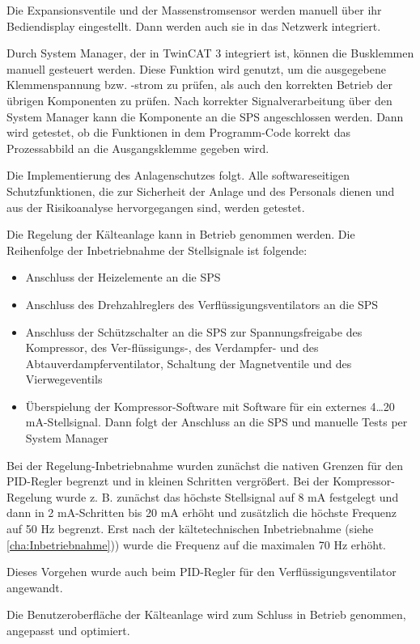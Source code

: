 Die Expansionsventile und der Massenstromsensor werden manuell über ihr Bediendisplay eingestellt. Dann werden  auch sie in das Netzwerk integriert. 
 
Durch System Manager, der in TwinCAT 3 integriert ist,   können die Busklemmen manuell gesteuert werden. Diese Funktion wird genutzt, um die ausgegebene Klemmenspannung bzw. -strom zu prüfen, als auch den korrekten Betrieb der übrigen Komponenten zu prüfen. Nach korrekter Signalverarbeitung über den System Manager kann die Komponente an die SPS angeschlossen werden. Dann wird getestet, ob die Funktionen in dem Programm-Code korrekt das Prozessabbild an die Ausgangsklemme gegeben wird. 

Die Implementierung des Anlagenschutzes folgt. Alle softwareseitigen Schutzfunktionen, die zur Sicherheit der Anlage und des Personals dienen und aus der Risikoanalyse hervorgegangen sind, werden getestet. 

Die Regelung der Kälteanlage kann in Betrieb genommen werden. Die Reihenfolge der Inbetriebnahme der Stellsignale ist folgende:

\begin{itemize}
\item Anschluss der Heizelemente an die SPS 
\item Anschluss des Drehzahlreglers des Verflüssigungsventilators an die SPS 
\item Anschluss der Schützschalter an die SPS zur Spannungsfreigabe des Kompressor, des Ver-flüssigungs-, des Verdampfer- und des Abtauverdampferventilator, Schaltung der Magnetventile und des Vierwegeventils
\item Überspielung der Kompressor-Software mit Software für ein externes 4\dots 20 mA-Stellsignal. Dann folgt der Anschluss an die SPS und manuelle Tests per System Manager
\end{itemize}

Bei der Regelung-Inbetriebnahme wurden zunächst die nativen Grenzen für den PID-Regler begrenzt und in kleinen Schritten vergrößert. Bei der Kompressor-Regelung wurde z. B. zunächst das höchste Stellsignal auf 8 mA festgelegt und dann in 2 mA-Schritten bis 20 mA erhöht und zusätzlich die höchste Frequenz auf 50 Hz begrenzt. Erst nach der kältetechnischen Inbetriebnahme (siehe \ref{cha:Inbetriebnahme}))  wurde die Frequenz auf die maximalen 70 Hz erhöht. 

Dieses Vorgehen wurde auch beim PID-Regler für den Verflüssigungsventilator angewandt.

Die Benutzeroberfläche der Kälteanlage wird zum Schluss in Betrieb genommen, angepasst und optimiert. 

